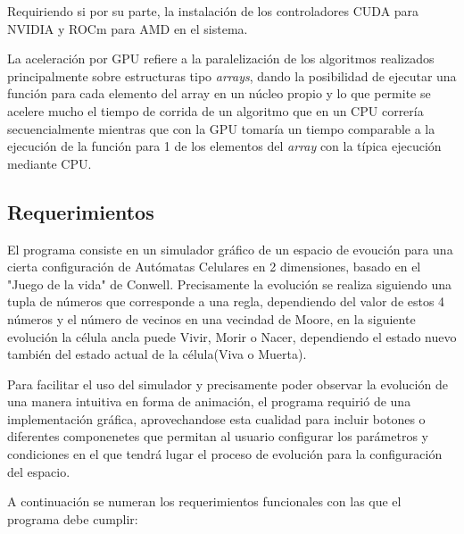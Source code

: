 \documentclass[]{article}
\begin{document}
			Requiriendo si por su parte, la instalación de los controladores CUDA para NVIDIA y ROCm para AMD en el sistema.
			
			La aceleración por GPU refiere a la paralelización de los algoritmos realizados principalmente sobre estructuras tipo \textit{arrays}, dando la posibilidad de ejecutar una función para cada elemento del array en un núcleo propio y lo que permite se acelere mucho el tiempo de corrida de un algoritmo que en un CPU correría secuencialmente mientras que con la GPU tomaría un tiempo comparable a la ejecución de la función para 1 de los elementos del \textit{array} con la típica ejecución mediante CPU.
			
	\newpage
	\subsection{Requerimientos}
		El programa consiste en un simulador gráfico de un espacio de evoución para una cierta configuración de Autómatas Celulares en 2 dimensiones, basado en el "Juego de la vida" de Conwell. Precisamente la evolución se realiza siguiendo una tupla de números que corresponde a una regla, dependiendo del valor de estos 4 números y el número de vecinos en una vecindad de Moore, en la siguiente evolución la célula ancla puede Vivir, Morir o Nacer, dependiendo el estado nuevo también del estado actual de la célula(Viva o Muerta).
		
		\hfill \break
		Para facilitar el uso del simulador y precisamente poder observar la evolución de una manera intuitiva en forma de animación, el programa requirió de una implementación gráfica, aprovechandose esta cualidad para incluir botones o diferentes componenetes que permitan al usuario configurar los parámetros y condiciones en el que tendrá lugar el proceso de evolución para la configuración del espacio.
		
		\hfill \break
		A continuación se numeran los requerimientos funcionales con las que el programa debe cumplir:
		
\end{document}
